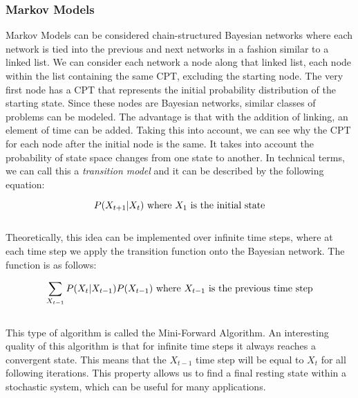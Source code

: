 \subsubsection{Markov Models}
Markov Models can be considered chain-structured Bayesian networks where each network is tied into the previous and next networks in a fashion similar to a linked list. We can consider each network a node along that linked list, each node within the list containing the same CPT, excluding the starting node. The very first node has a CPT that represents the initial probability distribution of the starting state. Since these nodes are Bayesian networks, similar classes of problems can be modeled. The advantage is that with the addition of linking, an element of time can be added. Taking this into account, we can see why the CPT for each node after the initial node is the same. It takes into account the probability of state space changes from one state to another. In technical terms, we can call this a \textit{transition model} and it can be described by the following equation:\par

\begin{equation}
  P(X_{t+1}|X_{t})
  \textnormal{ where } X_{1} \textnormal{ is the initial state}
\end{equation} \\[\eqnspace]

Theoretically, this idea can be implemented over infinite time steps, where at each time step we apply the transition function onto the Bayesian network. The function is as follows:\par

\begin{equation}
  \sum_{X_{t-1}} P(X_{t}|X_{t-1}) P(X_{t-1})
  \textnormal{ where } X_{t-1} \textnormal{ is the previous time step}
\end{equation} \\[\eqnspace]

This type of algorithm is called the Mini-Forward Algorithm. An interesting quality of this algorithm is that for infinite time steps it always reaches a convergent state. This means that the $X_{t-1}$ time step will be equal to $X_{t}$ for all following iterations. This property allows us to find a final resting state within a stochastic system, which can be useful for many applications.
